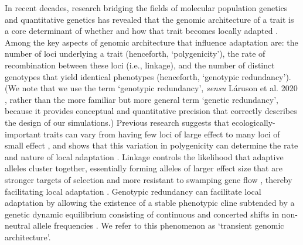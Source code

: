 \documentclass[9pt,twocolumn,twoside,lineno]{new_article}
\begin{document}
In recent decades, research bridging the fields
of molecular population genetics
and quantitative genetics
\cite{barghi_polygenic,barton,pritchard_human_adaptation,pritchard_sweeps_alone}
has revealed that the genomic architecture of a trait
is a core determinant of whether and how that trait
becomes locally adapted \cite{yeaman_review}.
Among the key aspects of genomic architecture that influence adaptation
\cite{barton,yeaman_whitlock,yeaman_review,lecorre} are:
the number of loci underlying a trait (henceforth, `polygenicity'),
the rate of recombination between these loci (i.e., linkage),
and the number of distinct genotypes that yield identical phenotypes
(henceforth, `genotypic redundancy').
(We note that we use the term `genotypic redundancy',
\textit{sensu} Láruson et al. 2020 \cite{laurson},
rather than the more familiar but more general term `genetic redundancy',
because it provides conceptual and quantitative precision
that correctly describes the design of our simulations.)
Previous research suggests that ecologically-important traits can vary from having
few loci of large effect \cite{martin,rees}
to many loci of small effect \cite{boyle,rockman,savolainen,sella,barghi_polygenic},
and shows that this variation in polygenicity can
determine the rate and nature of local adaptation \cite{yeaman_amnat}. 
Linkage controls the likelihood that adaptive alleles cluster together,
essentially forming alleles of larger effect size that are stronger 
targets of selection and more resistant
to swamping gene flow \cite{yeaman_whitlock},
thereby facilitating local adaptation \cite{tigano}.
Genotypic redundancy can facilitate local adaptation 
by allowing the existence of a stable phenotypic cline
subtended by a genetic dynamic equilibrium
consisting of continuous and concerted shifts in non-neutral allele frequencies
\cite{barghi_redundancy,manceau,yeaman_amnat}.
We refer to this phenomenon as `transient genomic architecture'.
\end{document}
